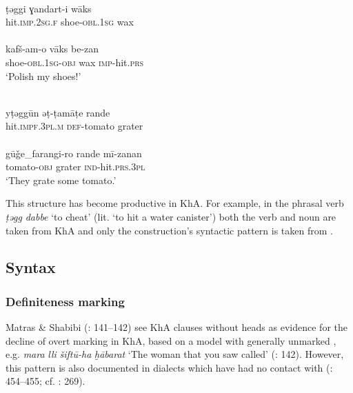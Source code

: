 \documentclass[output=paper,nonflat]{langsci/langscibook}
\begin{document}
\ea \label{taggi}
\\
\gll ṭəggi ɣandart-i wāks\\
     hit.\textsc{imp.2sg.f} shoe-\textsc{obl}.1\textsc{sg} wax\\
 
\\
\gll kafš-am-o vāks be-zan\\
     shoe-\textsc{obl.}1\textsc{sg-obj} wax \textsc{imp-}hit\textsc{.prs}\\
\glt ‘Polish my shoes!’
\z\z

\ea \label{tamate}
\\
\gll yṭəggūn əṭ-ṭamāṭe rande\\
     hit.\textsc{impf.3pl.m} \textsc{def}{}-tomato grater \\
 
\\
\gll gūǧe\_farangi-ro rande mī-zanan\\
     tomato-\textsc{obj} grater \textsc{ind}-hit\textsc{.prs.3pl} \\
\glt ‘They grate some tomato.’
\z\z

This structure has become productive in KhA. For example, in the phrasal verb \textit{ṭəgg} \textit{dabbe} ‘to cheat’ (lit. ‘to hit a water canister’) both the verb and noun are taken from KhA and only the construction’s syntactic pattern is taken from . 

\subsection{Syntax}
\subsubsection{Definiteness marking}

Matras \& Shabibi (\citeyear{MatrasShabibi2007}: 141–142) see KhA  clauses without  heads as evidence for the decline of overt  marking in KhA, based on a  model with generally unmarked , e.g. \textit{mara} \textit{lli} \textit{šiftū-ha} \textit{ḫābarat} ‘The woman that you saw called’ (\citeyear{MatrasShabibi2007}: 142). However, this pattern is also documented in  dialects which have had no contact with  (\citealt{Pat-El2017}: 454–455; cf. \citealt{Procházka2018Fertile}: 269).
\end{document}
